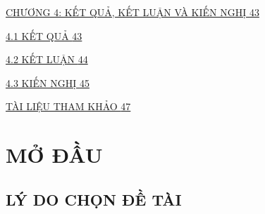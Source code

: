 \documentclass[
  12pt,
  a4paper,
]{report}
\begin{document}
\hyperref[section-2]{CHƯƠNG 4: KẾT QUẢ, KẾT LUẬN VÀ KIẾN NGHỊ
\hyperref[section-2]{43}}

\hyperref[kux1ebft-quux1ea3]{4.1 KẾT QUẢ
\hyperref[kux1ebft-quux1ea3]{43}}

\hyperref[kux1ebft-luux1eadn]{4.2 KẾT LUẬN
\hyperref[kux1ebft-luux1eadn]{44}}

\hyperref[kiux1ebfn-nghux1ecb]{4.3 KIẾN NGHỊ
\hyperref[kiux1ebfn-nghux1ecb]{45}}

\hyperref[_Toc237349145]{TÀI LIỆU THAM KHẢO
\hyperref[_Toc237349145]{47}}

\chapter*{}\label{section-1}

\chapter*{MỞ ĐẦU}\label{mux1edf-ux111ux1ea7u}

\section{LÝ DO CHỌN ĐỀ TÀI}\label{luxfd-do-chux1ecdn-ux111ux1ec1-tuxe0i}
\end{document}

